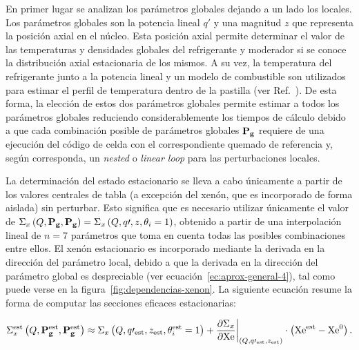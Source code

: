 \documentclass[11pt]{article}
\renewcommand{\vec}[1]{\ensuremath\mathbf{#1}}
\begin{document}
En primer lugar se analizan los parámetros globales dejando a un lado los locales. Los parámetros globales son la potencia lineal $q\prime$ y una magnitud $z$ que representa la posición axial en el núcleo. Esta posición axial permite determinar el valor de las temperaturas y densidades globales del refrigerante y moderador si se conoce la distribución axial estacionaria de los mismos. A su vez, la temperatura del refrigerante junto a la potencia lineal y un modelo de combustible son utilizados para estimar el perfil de temperatura dentro de la pastilla (ver Ref.~\cite{modelos-pastilla-relap}). De esta forma, la elección de estos dos parámetros globales permite estimar a todos los parámetros globales reduciendo considerablemente los tiempos de cálculo debido a que cada combinación posible de parámetros globales $\vec{P_g}$ requiere de una ejecución del código de celda con el correspondiente quemado de referencia y, según corresponda, un \emph{nested} o \emph{linear loop} para las perturbaciones locales.

La determinación del estado estacionario se lleva a cabo únicamente a partir de los valores centrales de tabla (a excepción del xenón, que es incorporado de forma aislada) sin perturbar. Esto significa que es necesario utilizar únicamente el valor de $\Sigma_x \left( Q, \vec{P_g}, \vec{P_g} \right) = \Sigma_x \left( Q, q\prime, z, \theta_i = \num{1} \right)$, obtenido a partir de una interpolación lineal de $n = \num{7}$ parámetros que toma en cuenta todas las posibles combinaciones entre ellos. El xenón estacionario es incorporado mediante la derivada en la dirección del parámetro local, debido a que la derivada en la dirección del parámetro global es despreciable (ver ecuación~\ref{ec:aprox-general-4}), tal como puede verse en la figura~\ref{fig:dependencias-xenon}. La siguiente ecuación resume la forma de computar las secciones eficaces estacionarias:

\begin{equation} \label{ec:aprox-general-7}
 \Sigma^{\text{est}}_x \left( Q, \vec{P^{\text{est}}_g}, \vec{P^{\text{est}}_g} \right) \approx
 \Sigma_x \left( Q, q\prime_{\text{est}}, z_{\text{est}}, \theta^{\text{est}}_i = \num{1} \right) + 
 \frac{\partial\Sigma_x}{\partial \text{Xe}}\bigg|_{\left( Q, q\prime_{\text{est}}, z_{\text{est}} \right)} \cdot \left( \text{Xe}^{\text{est}} - \text{Xe}^0 \right).
\end{equation}
\end{document}
